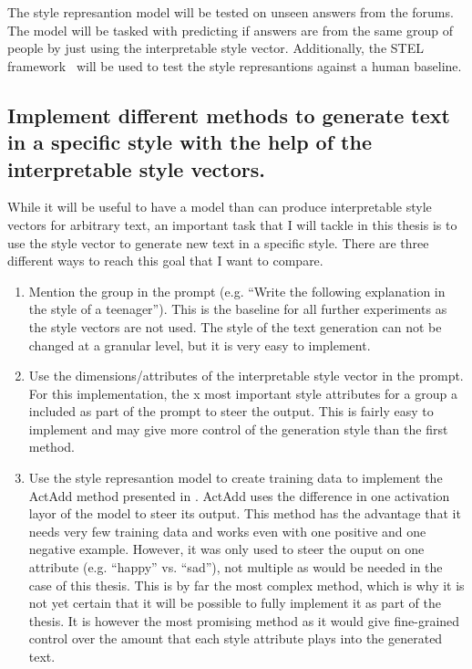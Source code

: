   The style represantion model will be tested on unseen answers from the forums. The model will be tasked with predicting if answers are from the same group of people by just using the interpretable style vector. Additionally, the STEL framework~\cite{wegmann-nguyen-2021-capture} will be used to test the style represantions against a human baseline.


   \subsection{Implement different methods to generate text in a specific style with the help of the interpretable style vectors.}
  While it will be useful to have a model than can produce interpretable style vectors for arbitrary text, an important task that I will tackle in this thesis is to use the style vector to generate new text in a specific style. There are three different ways to reach this goal that I want to compare.
  \begin{enumerate}
    \item Mention the group in the prompt (e.g. \enquote{Write the following explanation in the style of a teenager}). This is the baseline for all further experiments as the style vectors are not used. The style of the text generation can not be changed at a granular level, but it is very easy to implement.
    \item Use the dimensions/attributes of the interpretable style vector in the prompt. For this implementation, the x most important style attributes for a group a included as part of the prompt to steer the output. This is fairly easy to implement and may give more control of the generation style than the first method.
    \item Use the style represantion model to create training data to implement the ActAdd method presented in \citet{turnerActivationAdditionSteering2024}. ActAdd uses the difference in one activation layor of the model to steer its output. This method has the advantage that it needs very few training data and works even with one positive and one negative example. However, it was only used to steer the ouput on one attribute (e.g. \enquote{happy} vs. \enquote{sad}), not multiple as would be needed in the case of this thesis. This is by far the most complex method, which is why it is not yet certain that it will be possible to fully implement it as part of the thesis. It is however the most promising method as it would give fine-grained control over the amount that each style attribute plays into the generated text.
  \end{enumerate}

